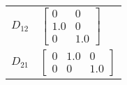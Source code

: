 \begin{tabular}{cl}
 $D_{12}$ & $\left[\begin{matrix}0 & 0\\1.0 & 0\\0 & 1.0\end{matrix}\right]$                                                                                                                     \\
 $D_{21}$ & $\left[\begin{matrix}0 & 1.0 & 0\\0 & 0 & 1.0\end{matrix}\right]$                                                                                                                    \\
\hline
\end{tabular}